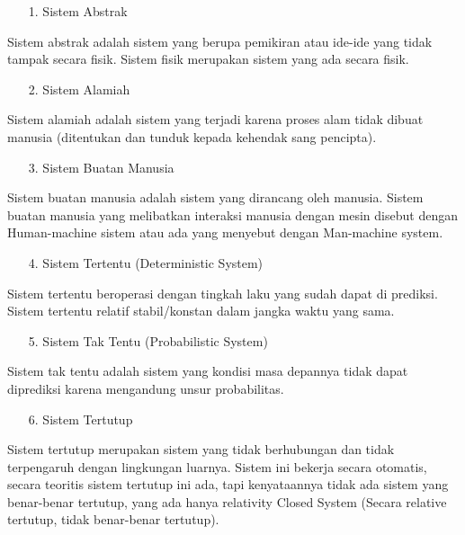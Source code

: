 \documentclass{jtetiproposalskripsi}
\begin{document}
\begin{itemize}
\item[1.] Sistem Abstrak
\end{itemize}

Sistem abstrak adalah sistem yang berupa pemikiran atau ide-ide yang tidak tampak secara fisik. Sistem fisik merupakan sistem yang ada secara fisik.

\begin{itemize}
\item[2.] Sistem Alamiah
\end{itemize}

Sistem alamiah adalah sistem yang terjadi karena proses alam tidak dibuat manusia (ditentukan dan tunduk kepada kehendak sang pencipta).
\begin{itemize}
\item[3.] Sistem Buatan Manusia
\end{itemize}

Sistem buatan manusia adalah sistem yang dirancang oleh manusia. Sistem buatan manusia yang melibatkan interaksi manusia dengan mesin disebut dengan Human-machine sistem atau ada yang menyebut dengan Man-machine system.
\begin{itemize}
\item[4.] Sistem Tertentu (Deterministic System)
\end{itemize}

Sistem tertentu beroperasi dengan tingkah laku yang sudah dapat di prediksi. Sistem tertentu relatif stabil/konstan dalam jangka waktu yang sama.

\begin{itemize}
\item[5.] Sistem Tak Tentu (Probabilistic System)
\end{itemize}

Sistem tak tentu adalah sistem yang kondisi masa depannya tidak dapat diprediksi karena mengandung unsur probabilitas.

\begin{itemize}
\item[6.] Sistem Tertutup
\end{itemize}

Sistem tertutup merupakan sistem yang tidak berhubungan dan tidak terpengaruh dengan lingkungan luarnya. Sistem ini bekerja secara otomatis, secara teoritis sistem tertutup ini ada, tapi kenyataannya tidak ada sistem yang benar-benar tertutup, yang ada hanya relativity Closed System (Secara relative tertutup, tidak benar-benar tertutup).
\end{document}
